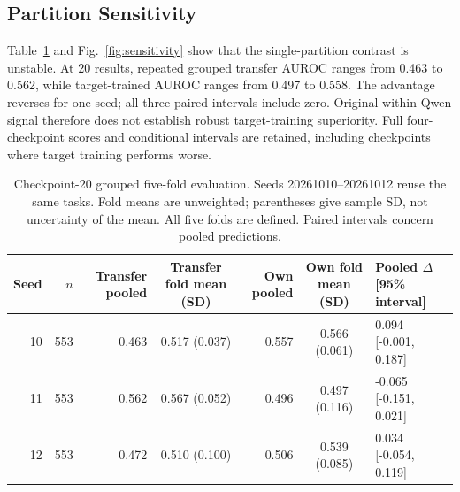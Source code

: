 \documentclass[conference]{IEEEtran}
\begin{document}
\subsection{Partition Sensitivity}
Table~\ref{tab:cv} and Fig.~\ref{fig:sensitivity} show that the single-partition contrast is unstable. At 20 results, repeated grouped transfer AUROC ranges from 0.463 to 0.562, while target-trained AUROC ranges from 0.497 to 0.558. The advantage reverses for one seed; all three paired intervals include zero. Original within-Qwen signal therefore does not establish robust target-training superiority. Full four-checkpoint scores and conditional intervals are retained, including checkpoints where target training performs worse.

\begin{table}[t]
\centering\footnotesize
\caption{Checkpoint-20 grouped five-fold evaluation. Seeds 20261010--20261012 reuse the same tasks. Fold means are unweighted; parentheses give sample SD, not uncertainty of the mean. All five folds are defined. Paired intervals concern pooled predictions.}
\label{tab:cv}
\begin{tabular}{@{}rrrcrcl@{}}\toprule
Seed & $n$ & Transfer pooled & Transfer fold mean (SD) & Own pooled & Own fold mean (SD) & Pooled $\Delta$ [95\% interval] \\
\midrule
10 & 553 & 0.463 & 0.517 (0.037) & 0.557 & 0.566 (0.061) & 0.094 [-0.001, 0.187] \\
11 & 553 & 0.562 & 0.567 (0.052) & 0.496 & 0.497 (0.116) & -0.065 [-0.151, 0.021] \\
12 & 553 & 0.472 & 0.510 (0.100) & 0.506 & 0.539 (0.085) & 0.034 [-0.054, 0.119] \\
\bottomrule\end{tabular}
\end{table}
\end{document}
